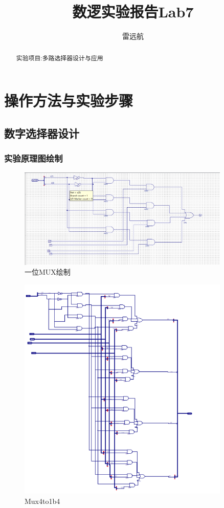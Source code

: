 \documentclass{article}
\title{数逻实验报告Lab7}
\author{雷远航}
\begin{document}
    
\maketitle

\begin{abstract}
    实验项目:多路选择器设计与应用
\end{abstract}

\section{操作方法与实验步骤}

\subsection{数字选择器设计}

\subsubsection*{实验原理图绘制}
    \begin{figure}[H]
	\centering
	\includegraphics[width=0.9\textwidth]{lab7/5.png}
	\caption{\label{Lab7}一位MUX绘制}
	\end{figure}

    \begin{figure}[H]
    \centering
    \includegraphics[width=0.9\textwidth]{lab7/2.png}
    \caption{\label{Lab7}Mux4to1b4}
    \end{figure}
\end{document}

